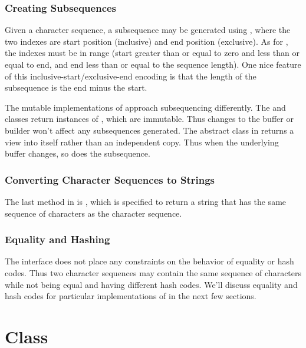 \subsubsection{Creating Subsequences}

Given a character sequence, a subsequence may be generated using
, where the two indexes are start position
(inclusive) and end position (exclusive).  As for , the
indexes must be in range (start greater than or equal to zero and less
than or equal to end, and end less than or equal to the sequence
length). One nice feature of this inclusive-start/exclusive-end
encoding is that the length of the subsequence is the end minus the
start.  

The mutable implementations of  approach
subsequencing differently.  The  and
 classes return instances of , which
are immutable.  Thus changes to the buffer or builder won't affect any
subsequences generated.  The  abstract class in
 returns a view into itself rather than an independent
copy.  Thus when the underlying buffer changes, so does the
subsequence.

\subsubsection{Converting Character Sequences to Strings}

The last method in  is , which is
specified to return a string that has the same sequence of characters
as the character sequence.  

\subsubsection{Equality and Hashing}

The  interface does not place any constraints on
the behavior of equality or hash codes.  Thus two character sequences
may contain the same sequence of characters while not being equal
and having different hash codes.  We'll discuss equality and hash
codes for particular implementations of  in the
next few sections.


\section{ Class}

